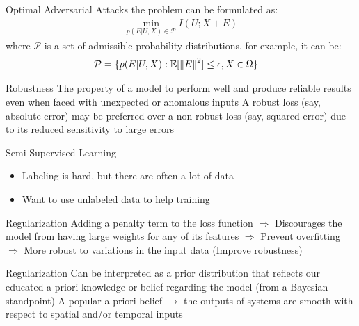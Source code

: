 \begin{frame}{Optimal Adversarial Attacks}
the problem can be formulated as:
\begin{align*}
\min_{p(E|U,X)\in \mathcal{P}} I(U;X+E)
\end{align*}
where $\mathcal{P}$ is a set of admissible probability distributions.
\pause
\newline
for example, it can be:
\begin{align*}
\mathcal{P} &= \{p(E|U,X): \mathbb{E}[\left\lVert E\right\rVert^2] \leq \epsilon, X \in \Omega\}
\end{align*}
\end{frame}

\begin{frame}{Robustness}
The property of a model to perform well and produce reliable results even when faced with unexpected or anomalous inputs
\newline 
\newline 
A robust loss (say, absolute error) may be preferred over a non-robust loss (say, squared error) due to its reduced sensitivity to large errors
\end{frame}


\begin{frame}{Semi-Supervised Learning}
\begin{itemize}
    \item Labeling is hard, but there are often a lot of data
    \item Want to use unlabeled data to help training
\end{itemize}
\end{frame}

\begin{frame}{Regularization}
Adding a penalty term to the loss function \newline 
$\Rightarrow$  Discourages the model from having large weights for any of its features
\newline $\Rightarrow$ Prevent overfitting
\newline $\Rightarrow$ More robust to variations in the input data (Improve robustness)
\end{frame}

\begin{frame}{Regularization}
Can be interpreted as a prior distribution that reflects our educated a priori knowledge or belief regarding the model (from a Bayesian standpoint)
\pause 
\newline
\newline
A popular a priori belief $\rightarrow$ the outputs of systems are smooth with respect to spatial and/or temporal inputs
\end{frame}

